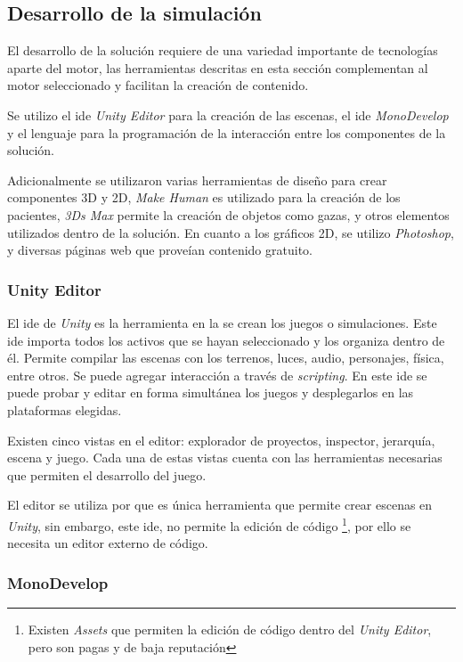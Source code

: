 \subsection{Desarrollo de la simulación}

El desarrollo de la solución requiere de una variedad importante de tecnologías
aparte del motor, las herramientas descritas en esta sección complementan al
motor seleccionado y facilitan la creación de contenido.

Se utilizo el \Gls{ide} \textit{Unity Editor} para la creación de las escenas,
el \Gls{ide} \textit{MonoDevelop} y el lenguaje \cs{} para la programación de la
interacción entre los componentes de la solución.

Adicionalmente se utilizaron varias herramientas de diseño para crear
componentes 3D y 2D, \textit{Make Human} es utilizado para la creación de los
pacientes, \textit{3Ds Max} permite la creación de objetos como gazas, y otros
elementos utilizados dentro de la solución. En cuanto a los gráficos 2D, se
utilizo \textit{Photoshop}, y diversas páginas web que proveían contenido
gratuito.

\subsubsection{Unity Editor}

El \Gls{ide} de \textit{Unity} es la herramienta en la se crean los juegos o
simulaciones. Este \Gls{ide} importa todos los activos que se hayan seleccionado
y los organiza dentro de él. Permite compilar las escenas con los terrenos,
luces, audio, personajes, física, entre otros. Se puede agregar interacción a
través de \textit{scripting}. En este \Gls{ide} se puede probar y editar en
forma simultánea los juegos y desplegarlos en las plataformas
elegidas\cite{unity3d}. 

Existen cinco vistas en el editor: explorador de proyectos, inspector,
jerarquía, escena y juego. Cada una de estas vistas cuenta con las herramientas
necesarias que permiten el desarrollo del juego\cite{unity3d}.

El editor se utiliza por que es única herramienta que permite crear escenas en
\textit{Unity}, sin embargo, este \Gls{ide}, no permite la edición de código
\footnote{Existen \textit{Assets} que permiten la edición de código dentro del
    \textit{Unity Editor}, pero son pagas y de baja reputación}, por ello se
necesita un editor externo de código.


\subsubsection{MonoDevelop}

